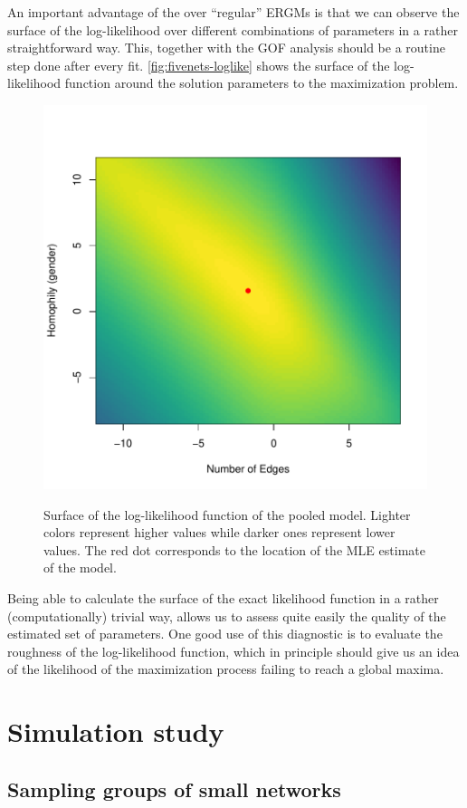 \documentclass[12pt]{article}
\begin{document}
An important advantage of the \ergmitos{} over ``regular'' ERGMs is that we can observe the surface of the log-likelihood over different combinations of parameters in a rather straightforward way. This, together with the GOF analysis should be a routine step done after every \ergmito{} fit. \autoref{fig:fivenets-loglike} shows the surface of the log-likelihood function around the solution parameters to the maximization problem.

\begin{figure}[tb]
    \centering
    \caption{Surface of the log-likelihood function of the pooled \ergmito{} model. Lighter colors represent higher values while darker ones represent lower values. The red dot corresponds to the location of the MLE estimate of the model.}
    \includegraphics[width=.7\linewidth]{figures/fivenets_loglike.pdf}
    \label{fig:fivenets-loglike}
\end{figure}

Being able to calculate the surface of the exact likelihood function in a rather (computationally) trivial way, allows us to assess quite easily the quality of the estimated set of parameters. One good use of this diagnostic is to evaluate the roughness of the log-likelihood function, which in principle should give us an idea of the likelihood of the maximization process failing to reach a global maxima.

\pagebreak
\section{Simulation study}

\subsection{Sampling groups of small networks}
\end{document}
